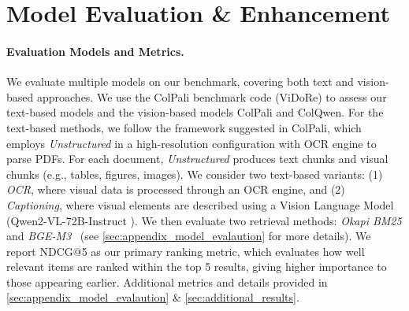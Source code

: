 \section{Model Evaluation \& Enhancement}
\label{sec:results}






\paragraph{Evaluation Models and Metrics.}
We evaluate multiple models on our benchmark, covering both text and vision-based approaches. We use the ColPali benchmark code (ViDoRe) to assess our text-based models and the vision-based models ColPali and ColQwen.
For the text-based methods, we follow the framework suggested in ColPali, which employs
\emph{Unstructured}
in a high-resolution configuration with OCR engine to parse PDFs.
For each document, \emph{Unstructured} produces text chunks and visual chunks (e.g., tables, figures, images).
We consider two text-based variants:
(1) \emph{OCR}, where visual data is processed through an OCR engine,
and (2) \emph{Captioning}, where visual elements are described using a Vision Language Model (Qwen2-VL-72B-Instruct \cite{wang2024qwen2}).
We then evaluate two retrieval methods:
\emph{Okapi BM25} and \emph{BGE-M3}~\cite{chen2024bge}
 (see \cref{sec:appendix_model_evalaution} for more details).
We report NDCG@5 as our primary ranking metric, which evaluates how well relevant items are ranked within the top 5 results, giving higher importance to those appearing earlier. Additional metrics and details provided in \ref{sec:appendix_model_evalaution} \& \ref{sec:additional_results}.








